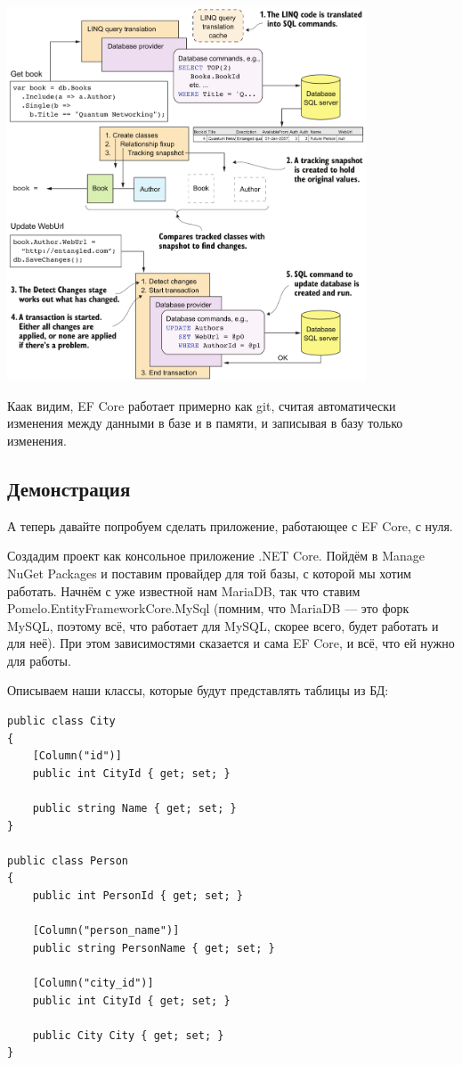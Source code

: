 \documentclass[a5paper]{article}
\begin{document}
\begin{center}
	\includegraphics[width=0.8\textwidth]{efCoreUpdate.png}
\end{center}

Каак видим, EF Core работает примерно как git, считая автоматически изменения между данными в базе и в памяти, и записывая в базу только изменения.

\subsection{Демонстрация}

А теперь давайте попробуем сделать приложение, работающее с EF Core, с нуля.

Создадим проект как консольное приложение .NET Core. Пойдём в Manage NuGet Packages и поставим провайдер для той базы, с которой мы хотим работать. Начнём с уже известной нам MariaDB, так что ставим Pomelo.EntityFrameworkCore.MySql (помним, что MariaDB --- это форк MySQL, поэтому всё, что работает для MySQL, скорее всего, будет работать и для неё). При этом зависимостями сказается и сама EF Core, и всё, что ей нужно для работы.

Описываем наши классы, которые будут представлять таблицы из БД:

\begin{verbatim}
public class City
{
    [Column("id")]
    public int CityId { get; set; }

    public string Name { get; set; }
}

public class Person
{
    public int PersonId { get; set; }

    [Column("person_name")]
    public string PersonName { get; set; }

    [Column("city_id")]
    public int CityId { get; set; }

    public City City { get; set; }
}
\end{verbatim}
\end{document}

